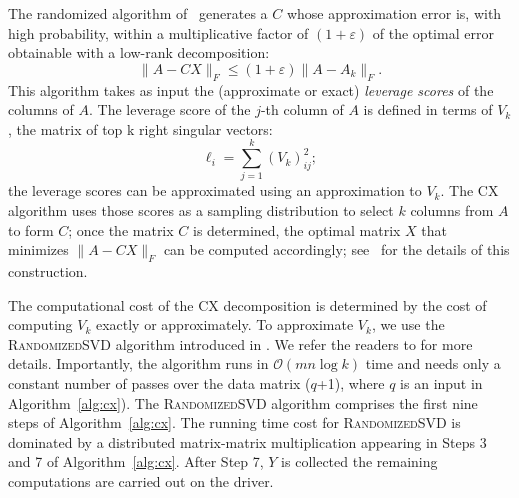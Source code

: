 The randomized algorithm of~\cite{DMM08} generates a $C$ whose approximation error is, with high probability, within a multiplicative factor of $(1+\varepsilon)$ of the optimal error obtainable with a low-rank decomposition:
\[
\|A - CX\|_F \leq (1+ \varepsilon) \|A - A_k\|_F.
\]
This algorithm takes as input the (approximate or exact) \emph{leverage scores} of the columns of $A.$ The leverage score of the $j$-th column of $A$ is defined in terms of $V_k$, the matrix of top k right singular vectors:
  \begin{equation}
    \label{eqn:lev}
     \ell_i = \sum_{j=1}^k (V_k) _{ij}^2;
   \end{equation}
the leverage scores can be approximated using an approximation to $V_k.$ The CX algorithm uses those scores as a sampling distribution to select $k$ columns from $A$ to form $C$; once the matrix $C$ is determined, the optimal matrix $X$ that minimizes $\|A-CX\|_F$ can be computed accordingly; see~\cite{DMM08} for the details of this construction.


The computational cost of the CX decomposition is determined by the cost of computing $V_k$ exactly or approximately. To approximate $V_k$, we use the \textsc{RandomizedSVD} algorithm introduced in \cite{MRT06,MRT11}. We refer the readers to \cite{HMT09_SIREV,Mah-mat-rev_BOOK} for more details. Importantly, the algorithm runs in $\mathcal{O}(mn \log k)$ time and needs only a constant number of passes over the data matrix ($q$+1), where $q$ is an input in Algorithm~\ref{alg:cx}).  The \textsc{RandomizedSVD} algorithm comprises the first nine steps of Algorithm~\ref{alg:cx}. The running time cost for \textsc{RandomizedSVD} is dominated by a distributed matrix-matrix multiplication appearing in Steps 3 and 7 of Algorithm~\ref{alg:cx}. After Step 7, $Y$ is collected the remaining computations are carried out on the driver.

